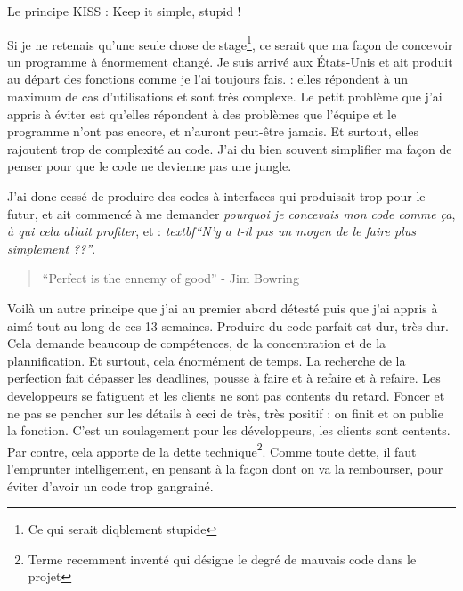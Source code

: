 \begin{center}Le principe KISS : Keep it simple, stupid !\end{center}

Si je ne retenais qu'une seule chose de stage\footnote{Ce qui serait diqblement stupide}, ce serait que ma façon de concevoir un programme à énormement changé. Je suis arrivé aux États-Unis et ait produit au départ des fonctions comme je l'ai toujours fais. : elles répondent à un maximum de cas d'utilisations et sont très complexe. Le petit problème que j'ai appris à éviter est qu'elles répondent à des problèmes que l'équipe et le programme n'ont pas encore, et n'auront peut-être jamais. Et surtout, elles rajoutent trop de complexité au code. J'ai du bien souvent simplifier ma façon de penser pour que le code ne devienne pas une jungle.

J'ai donc cessé de produire des codes à interfaces qui produisait trop pour le futur, et ait commencé à me demander \emph{pourquoi je concevais mon code comme ça}, \emph{à qui cela allait profiter}, et : \emph{textbf{``N'y a t-il pas un moyen de le faire plus simplement ??''}}.

\begin{quote}
``Perfect is the ennemy of good'' - Jim Bowring
\end{quote}

Voilà un autre principe que j'ai au premier abord détesté puis que j'ai appris à aimé tout au long de ces 13 semaines. Produire du code parfait est dur, très dur. Cela demande beaucoup de compétences, de la concentration et de la plannification. Et surtout, cela énormément de temps. La recherche de la perfection fait dépasser les deadlines, pousse à faire et à refaire et à refaire. Les developpeurs se fatiguent et les clients ne sont pas contents du retard. Foncer et ne pas se pencher sur les détails à ceci de très, très positif : on finit et on publie la fonction. C'est un soulagement pour les développeurs, les clients sont centents. Par contre, cela apporte de la dette technique\footnote{Terme recemment inventé qui désigne le degré de mauvais code dans le projet}. Comme toute dette, il faut l'emprunter intelligement, en pensant à la façon dont on va la rembourser, pour éviter d'avoir un code trop gangrainé.
